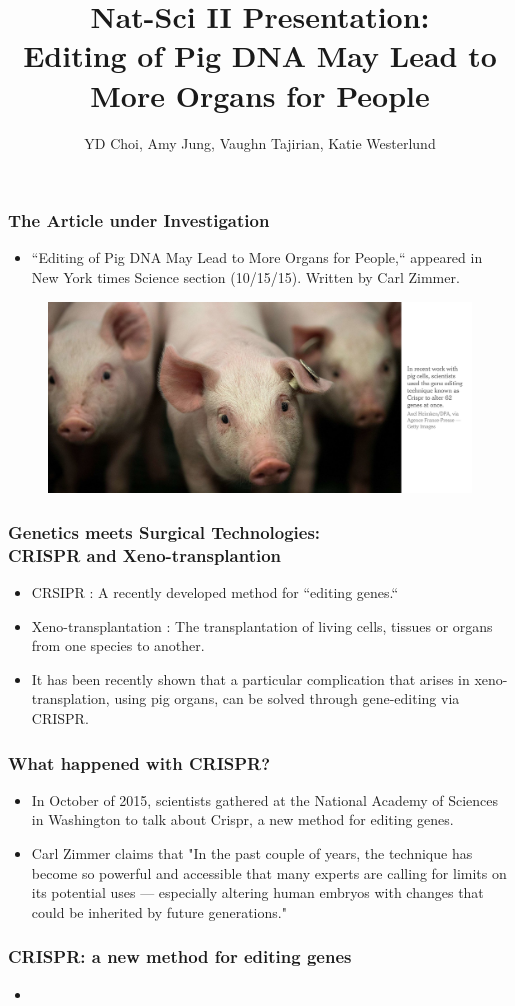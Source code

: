 \documentclass{beamer}
\title{Nat-Sci II Presentation: \\
Editing of Pig DNA May Lead to More Organs for People}
\author{YD Choi, Amy Jung, Vaughn Tajirian, Katie Westerlund }
\institute{New York University}
\begin{document}
 
\frame{\titlepage} 

\begin{frame}
\frametitle{The Article under Investigation}
\begin{itemize} 
\item ``Editing of Pig DNA May Lead to More Organs for People,`` appeared in
New York times Science section (10/15/15). Written by Carl Zimmer.
\end{itemize}
\begin{figure}[h!]
  \centering
    \includegraphics[width=1\textwidth]{edit-pigs.png}
\end{figure}
\end{frame}

\begin{frame}
\frametitle{Genetics meets Surgical Technologies: \\
CRISPR and Xeno-transplantion}
\begin{itemize}
\item CRSIPR : A recently developed method for 
``editing genes.``
\item Xeno-transplantation :
The transplantation of living cells, tissues or organs
from one species to another. 
\item It has been recently shown that a particular
complication that arises in
xeno-transplation, using pig organs,
can be solved through gene-editing via CRISPR. 
\end{itemize}
\end{frame}

\begin{frame}
\frametitle{What happened with CRISPR?}
\begin{itemize}
\item In October of 2015, scientists gathered at the National Academy of Sciences
in Washington to talk about Crispr, a new method for editing genes.

\item Carl Zimmer claims that "In the past couple of years, 
the technique has become so powerful and accessible that many experts are 
calling for limits on its potential uses — especially altering human 
embryos with changes that could be inherited by future generations."
\end{itemize}
\end{frame}
\begin{frame}

\frametitle{CRISPR: a new method for editing genes}
\begin{itemize}
\item 
\end{itemize}
\end{frame}
\end{document}
